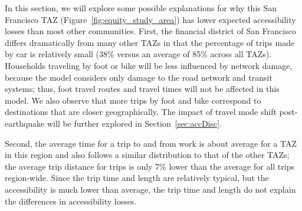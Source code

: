 In this section, we will explore some possible explanations for why this San Francisco TAZ (Figure~\ref{fig:equity_study_area}) has lower expected accessibility losses than most other communities.
First, the financial district of San Francisco differs dramatically from many other TAZs in that the percentage of trips made by car is relatively small (38\% versus an average of 85\% across all TAZs). Households traveling by foot or bike will be less influenced by network damage, because the model considers only damage to the road network and transit systems; thus, foot travel routes and travel times will not be affected in this model. We also observe that more trips by foot and bike correspond to destinations that are closer geographically. The impact of travel mode shift post-earthquake will be further explored in Section~\ref{sec:accDisc}.
 
 Second,  the average time for a trip to and from work is about average for a TAZ in this region and also follows a similar distribution to that of the other TAZs; the average trip distance for trips is only 7\% lower than the average for all trips region-wide. Since the trip time and length are relatively typical, but the accessibility is much lower than average, the trip time and length do not explain the differences in accessibility losses.
 





